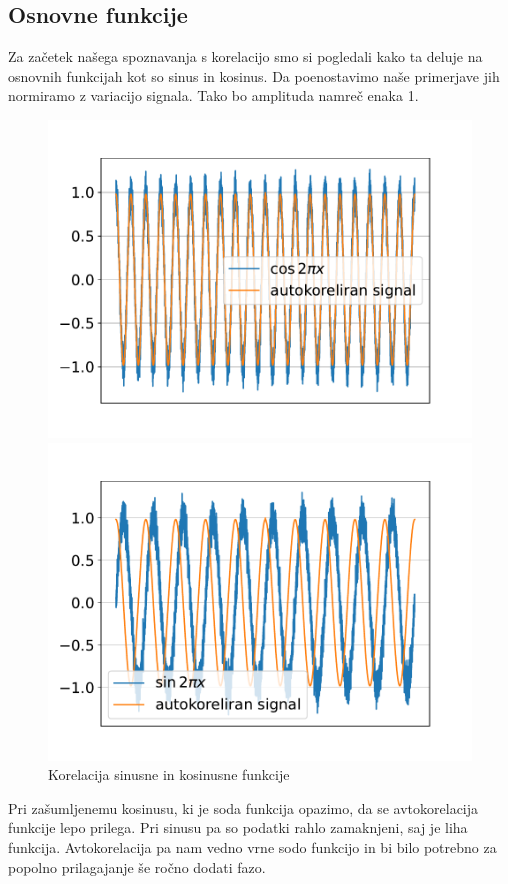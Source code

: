 \documentclass{article}
\begin{document}
\subsection{Osnovne funkcije}
Za začetek našega spoznavanja s korelacijo smo si pogledali kako ta deluje na osnovnih funkcijah kot so sinus in kosinus. Da poenostavimo naše primerjave jih normiramo z variacijo signala. Tako bo amplituda namreč enaka 1. 
\begin{figure}[H]
    \begin{minipage}{0.5\textwidth}
        \centering
        \includegraphics[width=\textwidth]{cosine.pdf}
    \end{minipage}%
    \hfill
    \begin{minipage}{0.5\textwidth}
        \centering
        \includegraphics[width=\textwidth]{sine.pdf}
    \end{minipage}
	\caption{Korelacija sinusne in kosinusne funkcije}
\end{figure}
Pri zašumljenemu kosinusu, ki je soda funkcija opazimo, da se avtokorelacija funkcije lepo prilega. Pri sinusu pa so podatki rahlo zamaknjeni, saj je liha funkcija. Avtokorelacija pa nam vedno vrne sodo funkcijo in bi bilo potrebno za popolno prilagajanje še ročno dodati fazo.
\end{document}
